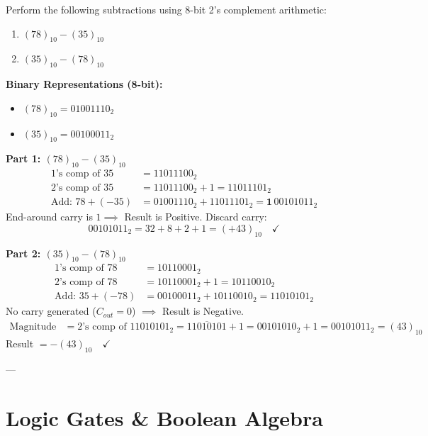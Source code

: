 \begin{example}
Perform the following subtractions using 8-bit 2's complement arithmetic:
\begin{enumerate}
    \item $(78)_{10} - (35)_{10}$
    \item $(35)_{10} - (78)_{10}$
\end{enumerate}

\tcblower
\textbf{Binary Representations (8-bit):}
\begin{itemize}
    \item $(78)_{10} = 01001110_2$
    \item $(35)_{10} = 00100011_2$
\end{itemize}

\textbf{Part 1: $(78)_{10} - (35)_{10}$}
\begin{align*}
    1\text{'s comp of } 35 &= 11011100_2 \\
    2\text{'s comp of } 35 &= 11011100_2 + 1 = 11011101_2 \\
    \text{Add: } 78 + (-35) &= 01001110_2 + 11011101_2 = \mathbf{1}\,00101011_2
\end{align*}
End-around carry is $1 \implies$ Result is Positive. Discard carry:
\begin{equation*}
    00101011_2 = 32 + 8 + 2 + 1 = (+43)_{10} \quad \checkmark
\end{equation*}

\textbf{Part 2: $(35)_{10} - (78)_{10}$}
\begin{align*}
    1\text{'s comp of } 78 &= 10110001_2 \\
    2\text{'s comp of } 78 &= 10110001_2 + 1 = 10110010_2 \\
    \text{Add: } 35 + (-78) &= 00100011_2 + 10110010_2 = 11010101_2
\end{align*}
No carry generated ($C_{out} = 0$) $\implies$ Result is Negative.
\begin{align*}
    \text{Magnitude} &= 2\text{'s comp of } 11010101_2 = \overline{11010101} + 1 = 00101010_2 + 1 = 00101011_2 = (43)_{10}
\end{align*}
Result $= -(43)_{10} \quad \checkmark$
\end{example}

---

\section{Logic Gates \& Boolean Algebra}

